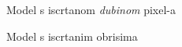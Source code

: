 \begin{figure}[H]
\caption{Model s iscrtanom \emph{dubinom} pixel-a}
\label{fig:monkey-depth}
\begin{center}
\end{center}
\end{figure}


\begin{figure}[H]
\caption{Model s iscrtanim obrisima}
\label{fig:monkey-edges}
\begin{center}
\end{center}
\end{figure}

